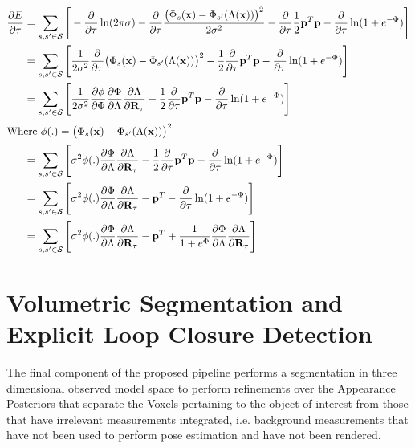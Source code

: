 \begin{align}
  \label{eqn:probobj_log_post_rot_grad}
  \frac{\partial E}{\partial \tau} &=
  \sum_{s, s' \in \mathcal{S}} \Bigg[ - \frac{\partial}{\partial \tau}
  \ln(2\pi\sigma) - \frac{\partial}{\partial \tau}
  \frac{\big(\Phi_{s}(\mathbf{x}) -
  \Phi_{s'}(\Lambda(\mathbf{x}))\big)^{2}}{2\sigma^{2}} -
  \frac{\partial}{\partial \tau} \frac{1}{2} \mathbf{p}^{T}\mathbf{p} -
  \frac{\partial}{\partial \tau} \ln(1 + e^{-\Phi})
  \Bigg]\\
  &= \sum_{s, s' \in \mathcal{S}} \Bigg[ \frac{1}{2\sigma^{2}}
  \frac{\partial}{\partial \tau}
  \big(\Phi_{s}(\mathbf{x}) - \Phi_{s'}(\Lambda(\mathbf{x}))\big)^{2} -
  \frac{1}{2} \frac{\partial}{\partial \tau}
  \mathbf{p}^{T}\mathbf{p} - \frac{\partial}{\partial \tau} \ln(1 + e^{-\Phi})
  \Bigg]\\
  &= \sum_{s, s' \in \mathcal{S}} \Bigg[ \frac{1}{2\sigma^{2}}
  \frac{\partial \phi}{\partial \Phi} \frac{\partial \Phi}{\partial \Lambda}
  \frac{\partial \Lambda}{\partial \mathbf{R}_{\tau}} -
  \frac{1}{2} \frac{\partial}{\partial \tau}
  \mathbf{p}^{T}\mathbf{p} - \frac{\partial}{\partial \tau} \ln(1 + e^{-\Phi})
  \Bigg]\\
  \shortintertext{Where $\phi(.) =
  \big(\Phi_{s}(\mathbf{x}) - \Phi_{s'}(\Lambda(\mathbf{x}))\big)^{2}$}
  &= \sum_{s, s' \in \mathcal{S}} \Bigg[ \sigma^{2} \phi(.)
  \frac{\partial \Phi}{\partial \Lambda}
  \frac{\partial \Lambda}{\partial \mathbf{R}_{\tau}} -
  \frac{1}{2} \frac{\partial}{\partial \tau}
  \mathbf{p}^{T}\mathbf{p} - \frac{\partial}{\partial \tau} \ln(1 + e^{-\Phi})
  \Bigg]\\
  &= \sum_{s, s' \in \mathcal{S}} \Bigg[ \sigma^{2} \phi(.)
  \frac{\partial \Phi}{\partial \Lambda}
  \frac{\partial \Lambda}{\partial \mathbf{R}_{\tau}} - \mathbf{p}^{T} -
  \frac{\partial}{\partial \tau} \ln(1 + e^{-\Phi})
    \Bigg]\\
  &= \sum_{s, s' \in \mathcal{S}} \Bigg[ \sigma^{2} \phi(.)
  \frac{\partial \Phi}{\partial \Lambda}
  \frac{\partial \Lambda}{\partial \mathbf{R}_{\tau}} - \mathbf{p}^{T} +
  \frac{1}{1 + e^{\Phi}} \frac{\partial \Phi}{\partial \Lambda}
  \frac{\partial \Lambda}{\partial \mathbf{R}_{\tau}} \Bigg]
\end{align}

\section{Volumetric Segmentation and Explicit Loop Closure Detection}
The final component of the proposed pipeline performs a segmentation in three
dimensional observed model space to perform refinements over the Appearance
Posteriors that separate the Voxels pertaining to the object of interest from
those that have irrelevant measurements integrated, i.e. background measurements
that have not been used to perform pose estimation and have not been rendered.

